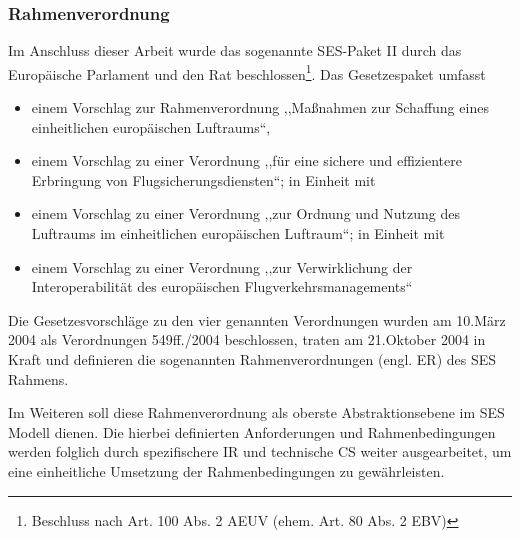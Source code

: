 \subsubsection{Rahmenverordnung}

Im Anschluss dieser Arbeit wurde das sogenannte \acs{SES}-Paket II durch das Europäische Parlament und den Rat beschlossen\footnote{Beschluss nach Art. 100 Abs. 2 AEUV (ehem. Art. 80 Abs. 2 EBV)}.
Das Gesetzespaket umfasst 

\begin{itemize}
    \item einem Vorschlag zur Rahmenverordnung ,,Maßnahmen zur Schaffung eines einheitlichen europäischen Luftraums``\cite{kom_01_564, kom_01_123},
    \item einem Vorschlag zu einer Verordnung ,,für eine sichere und effizientere Erbringung von Flugsicherungsdiensten``\cite{kom_01_564_1}; in Einheit mit
    \item  einem Vorschlag zu einer Verordnung ,,zur Ordnung und Nutzung des Luftraums im einheitlichen europäischen Luftraum``\cite{kom_01_564_2}; in Einheit mit
    \item  einem Vorschlag zu einer Verordnung ,,zur Verwirklichung der Interoperabilität des europäischen Flugverkehrsmanagements``\cite{kom_01_564_3}
\end{itemize}

Die Gesetzesvorschläge zu den vier genannten Verordnungen wurden am 10.März 2004 als Verordnungen 549ff./2004 beschlossen, traten am 21.Oktober 2004 in Kraft \cite[S.12]{eu_ses_studie} und definieren die sogenannten Rahmenverordnungen (engl. \acf{ER}) des \ac{SES} Rahmens.

Im Weiteren soll diese Rahmenverordnung als oberste Abstraktionsebene im \ac{SES} Modell dienen. 
Die hierbei definierten Anforderungen und Rahmenbedingungen werden folglich durch spezifischere \acf{IR} und technische \acf{CS} weiter ausgearbeitet, um eine einheitliche Umsetzung der Rahmenbedingungen zu gewährleisten.





